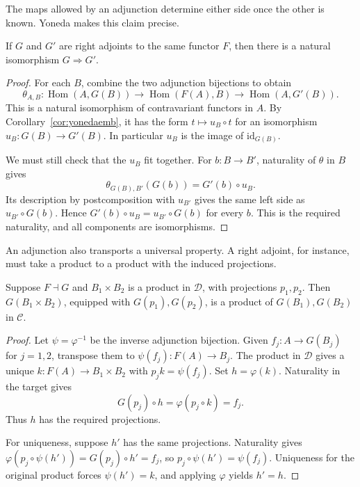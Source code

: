 The maps allowed by an adjunction determine either side once the other is known. Yoneda makes this claim precise.

\begin{theorem}\label{thm:adjunique}
If $G$ and $G'$ are right adjoints to the same functor $F$, then there is a natural isomorphism $G\Rightarrow G'$.
\end{theorem}

\begin{proof}
For each $B$, combine the two adjunction bijections to obtain
\[
\theta_{A,B}:\operatorname{Hom}(A,G(B))
 \longrightarrow\operatorname{Hom}(F(A),B)
 \longrightarrow\operatorname{Hom}(A,G'(B)).
\]
This is a natural isomorphism of contravariant functors in $A$. By Corollary~\ref{cor:yonedaemb}, it has the form $t\mapsto u_B\circ t$ for an isomorphism $u_B:G(B)\to G'(B)$. In particular $u_B$ is the image of $\mathrm{id}_{G(B)}$.

We must still check that the $u_B$ fit together. For $b:B\to B'$, naturality of $\theta$ in $B$ gives
\[
\theta_{G(B),B'}(G(b))=G'(b)\circ u_B.
\]
Its description by postcomposition with $u_{B'}$ gives the same left side as $u_{B'}\circ G(b)$. Hence $G'(b)\circ u_B=u_{B'}\circ G(b)$ for every $b$. This is the required naturality, and all components are isomorphisms.
\end{proof}

An adjunction also transports a universal property. A right adjoint, for instance, must take a product to a product with the induced projections.

\begin{theorem}\label{thm:rapl}
Suppose $F\dashv G$ and $B_1\times B_2$ is a product in $\mathcal D$, with projections $p_1,p_2$. Then $G(B_1\times B_2)$, equipped with $G(p_1),G(p_2)$, is a product of $G(B_1),G(B_2)$ in $\mathcal C$.
\end{theorem}

\begin{proof}
Let $\psi=\varphi^{-1}$ be the inverse adjunction bijection. Given $f_j:A\to G(B_j)$ for $j=1,2$, transpose them to $\psi(f_j):F(A)\to B_j$. The product in $\mathcal D$ gives a unique $k:F(A)\to B_1\times B_2$ with $p_jk=\psi(f_j)$. Set $h=\varphi(k)$. Naturality in the target gives
\[
G(p_j)\circ h=\varphi(p_j\circ k)=f_j.
\]
Thus $h$ has the required projections.

For uniqueness, suppose $h'$ has the same projections. Naturality gives $\varphi(p_j\circ\psi(h'))=G(p_j)\circ h'=f_j$, so $p_j\circ\psi(h')=\psi(f_j)$. Uniqueness for the original product forces $\psi(h')=k$, and applying $\varphi$ yields $h'=h$.
\end{proof}

